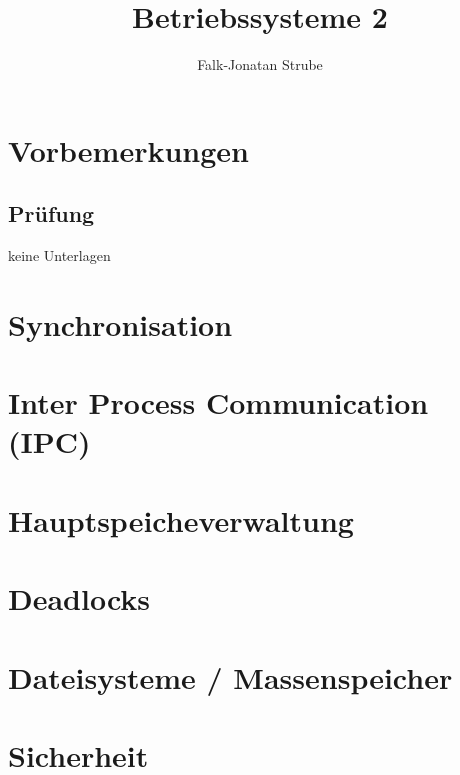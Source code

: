 \documentclass{scrreprt}
\title{Betriebssysteme 2}
\author{Falk-Jonatan Strube}
\begin{document}
\maketitle
\newpage
\tableofcontents
\newpage

\chapter*{Vorbemerkungen}

\section*{Prüfung}
keine Unterlagen

\chapter{Synchronisation}


\chapter{Inter Process Communication (IPC)}


\chapter{Hauptspeicheverwaltung}


\chapter{Deadlocks}


\chapter{Dateisysteme / Massenspeicher}


\chapter{Sicherheit}




\end{document}
